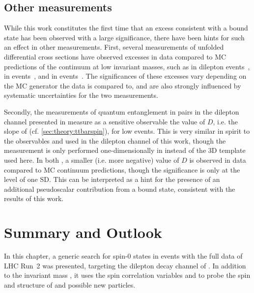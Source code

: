 \subsection{Other \ttbartitle measurements}

While this work constitutes the first time that an excess consistent with a \ttbar bound state has been observed with a large significance, there have been hints for such an effect in other \ttbar measurements. First, several measurements of unfolded \ttbar differential cross sections have observed excesses in data compared to MC predictions of the \ttbar continuum at low invariant masses, such as \mtt in dilepton events~\cite{CMS:TOP-20-006}, \mll in \emu events~\cite{ATLAS:2023gsl}, and \mtt in \ljets events~\cite{CMS:TOP-17-002}. The significances of these excesses vary depending on the MC generator the data is compared to, and are also strongly influenced by systematic uncertainties for the two \mtt measurements.

Secondly, the measurements of quantum entanglement in \ttbar pairs in the dilepton channel presented in  measure as a sensitive observable the value of $D$, i.e. the slope of \chel (cf. \cref{sec:theory:ttbarspin}), for low \mtt events. This is very similar in spirit to the observables \mtt and \chel used in the dilepton channel of this work, though the measurement is only performed one-dimensionally in \chel instead of the 3D \mttchelchan template used here. In both , a smaller (i.e. more negative) value of $D$ is observed in data compared to MC \ttbar continuum predictions, though the significance is only at the level of one SD. This can be interpreted as a hint for the presence of an additional pseudoscalar contribution from a \ttbar bound state, consistent with the results of this work.



\section{Summary and Outlook}
\label{sec:ah:summary}

In this chapter, a generic search for spin-0 states in \ttbar events with the full data of LHC Run~2 was presented, targeting the dilepton decay channel of \ttbar. In addition to the invariant mass \mtt, it uses the spin correlation variables \chel and \chan to probe the spin and \CP structure of \ttbar and possible new particles.


